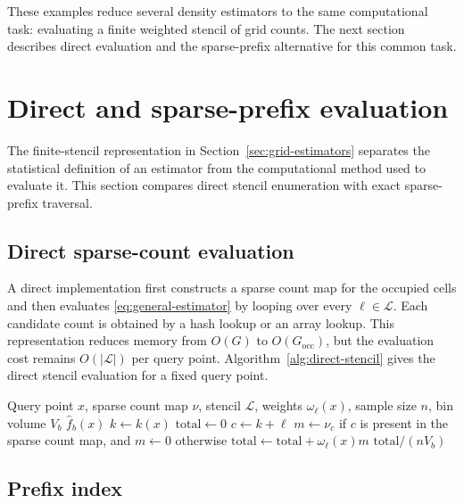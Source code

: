 \documentclass[pdflatex,sn-mathphys-ay]{sn-jnl}
\theoremstyle{thmstyleone}
\newcommand{\fhatb}{\widehat{f}_b}
\newcommand{\stencil}{\mathcal{L}}
\begin{document}
These examples reduce several density estimators to the same computational task: evaluating a finite weighted stencil of grid counts. The next section describes direct evaluation and the sparse-prefix alternative for this common task.

\section{Direct and sparse-prefix evaluation}
\label{sec:sparse-traversal}

The finite-stencil representation in Section~\ref{sec:grid-estimators} separates the statistical definition of an estimator from the computational method used to evaluate it. This section compares direct stencil enumeration with exact sparse-prefix traversal.

\subsection{Direct sparse-count evaluation}

A direct implementation first constructs a sparse count map for the occupied cells and then evaluates \eqref{eq:general-estimator} by looping over every \(\ell\in\stencil\). Each candidate count is obtained by a hash lookup or an array lookup. This representation reduces memory from \(O(G)\) to \(O(G_{\mathrm{occ}})\), but the evaluation cost remains \(O(|\stencil|)\) per query point. Algorithm~\ref{alg:direct-stencil} gives the direct stencil evaluation for a fixed query point.

\begin{algorithm}[H]
\caption{Direct stencil evaluation}
\label{alg:direct-stencil}
\begin{algorithmic}[1]
\Require Query point \(x\), sparse count map \(\nu\), stencil \(\stencil\), weights \(\omega_\ell(x)\), sample size \(n\), bin volume \(V_b\)
\Ensure \(\fhatb(x)\)
\State \(k \gets k(x)\)
\State \(\mathrm{total} \gets 0\)
\ForAll{\(\ell\in\stencil\)}
  \State \(c \gets k+\ell\)
  \State \(m \gets \nu_c\) if \(c\) is present in the sparse count map, and \(m \gets 0\) otherwise
  \State \(\mathrm{total} \gets \mathrm{total}+\omega_\ell(x)m\)
\EndFor
\State \Return \(\mathrm{total}/(nV_b)\)
\end{algorithmic}
\end{algorithm}

\subsection{Prefix index}
\end{document}

